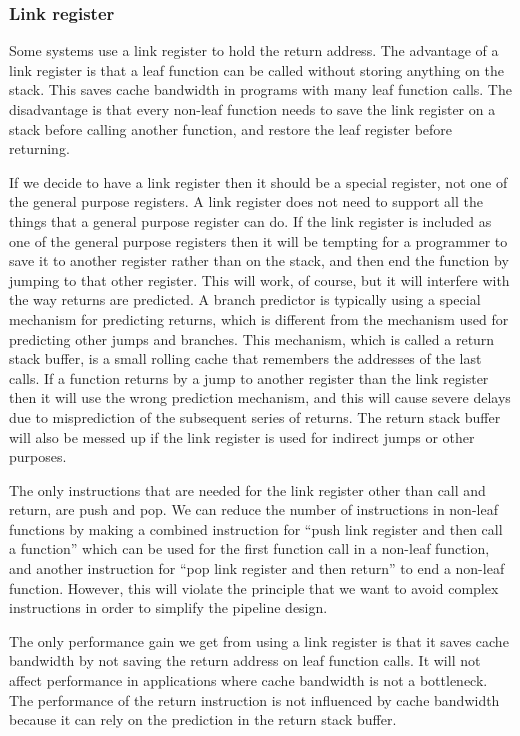 \documentclass[forwardcom.tex]{subfiles}
\begin{document}
\subsubsection{Link register}
Some systems use a link register to hold the return address. The advantage of a link register is that a leaf function can be called without storing anything on the stack. This saves cache bandwidth in programs with many leaf function calls. The disadvantage is that every non-leaf function needs to save the link register on a stack before calling another function, and restore the leaf register before returning.
\vspace{2mm}

If we decide to have a link register then it should be a special register, not one of the general purpose registers. A link register does not need to support all the things that a general purpose register can do. If the link register is included as one of the general purpose registers then it will be tempting for a programmer to save it to another register rather than on the stack, and then end the function by jumping to that other register. This will work, of course, but it will interfere with the way returns are predicted. A branch predictor is typically using a special mechanism for predicting returns, which is different from the mechanism used for predicting other jumps and branches. This mechanism, which is called a return stack buffer, is a small rolling cache that remembers the addresses of the last calls. If a function returns by a jump to another register than the link register then it will use the wrong prediction mechanism, and this will cause severe delays due to misprediction of the subsequent series of returns. The return stack buffer will also be messed up if the link register is used for indirect jumps or other purposes.
\vspace{2mm}

The only instructions that are needed for the link register other than call and return, are push and pop. We can reduce the number of instructions in non-leaf functions by making a combined instruction for ``push link register and then call a function'' which can be used for the first function call in a non-leaf function, and another instruction for ``pop link register and then return'' to end a non-leaf function. However, this will violate the principle that we want to avoid complex instructions in order to simplify the pipeline design.
\vspace{2mm}

The only performance gain we get from using a link register is that it saves cache bandwidth by not saving the return address on leaf function calls. It will not affect performance in applications where cache bandwidth is not a bottleneck. The performance of the return instruction is not influenced by cache bandwidth because it can rely on the prediction in the return stack buffer.
\vspace{2mm}
\end{document}
